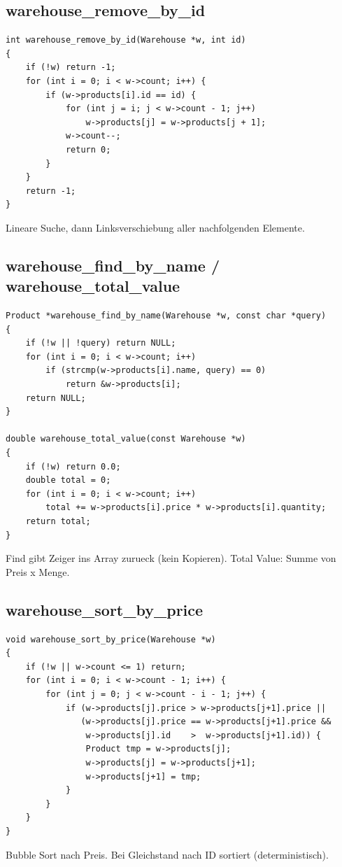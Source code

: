 \documentclass[10pt, a4paper]{article}
\begin{document}
\subsection{warehouse\_remove\_by\_id}
\begin{lstlisting}
int warehouse_remove_by_id(Warehouse *w, int id)
{
    if (!w) return -1;
    for (int i = 0; i < w->count; i++) {
        if (w->products[i].id == id) {
            for (int j = i; j < w->count - 1; j++)
                w->products[j] = w->products[j + 1];
            w->count--;
            return 0;
        }
    }
    return -1;
}
\end{lstlisting}
Lineare Suche, dann Linksverschiebung aller nachfolgenden Elemente.

\subsection{warehouse\_find\_by\_name / warehouse\_total\_value}
\begin{lstlisting}
Product *warehouse_find_by_name(Warehouse *w, const char *query)
{
    if (!w || !query) return NULL;
    for (int i = 0; i < w->count; i++)
        if (strcmp(w->products[i].name, query) == 0)
            return &w->products[i];
    return NULL;
}

double warehouse_total_value(const Warehouse *w)
{
    if (!w) return 0.0;
    double total = 0;
    for (int i = 0; i < w->count; i++)
        total += w->products[i].price * w->products[i].quantity;
    return total;
}
\end{lstlisting}
Find gibt Zeiger ins Array zurueck (kein Kopieren). Total Value: Summe von Preis x Menge.

\subsection{warehouse\_sort\_by\_price}
\begin{lstlisting}
void warehouse_sort_by_price(Warehouse *w)
{
    if (!w || w->count <= 1) return;
    for (int i = 0; i < w->count - 1; i++) {
        for (int j = 0; j < w->count - i - 1; j++) {
            if (w->products[j].price > w->products[j+1].price ||
               (w->products[j].price == w->products[j+1].price &&
                w->products[j].id    >  w->products[j+1].id)) {
                Product tmp = w->products[j];
                w->products[j] = w->products[j+1];
                w->products[j+1] = tmp;
            }
        }
    }
}
\end{lstlisting}
Bubble Sort nach Preis. Bei Gleichstand nach ID sortiert (deterministisch).
\end{document}
